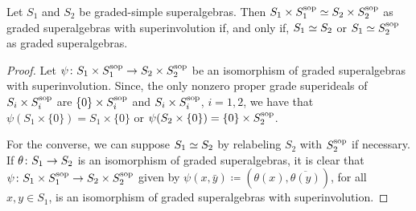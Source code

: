 



\begin{lemma}\label{lemma:iso-SxSsop}
    Let $S_1$ and $S_2$ be graded-simple superalgebras. 
    Then $S_1\times S_1^{\mathrm{sop}} \simeq S_2\times S_2^{\mathrm{sop}}$ as graded superalgebras with superinvolution if, and only if, $S_1 \simeq S_2$ or $S_1 \simeq S_2^{\mathrm{sop}}$ as graded superalgebras.
\end{lemma}

\begin{proof}
    Let $\psi\colon S_1\times S_1^{\mathrm{sop}} \to S_2\times S_2^{\mathrm{sop}}$ be an isomorphism of graded superalgebras with superinvolution. 
    Since, the only nonzero proper grade superideals of $S_i \times S_i^{\mathrm{sop}}$ are $\{ 0 \} \times S_i^{\mathrm{sop}}$ and $S_i\times S_i^{\mathrm{sop}}$, $i = 1,2$, we have that $\psi(S_1\times \{ 0 \}) = S_1\times \{ 0 \}$ or $\psi(S_2\times \{ 0 \}) = \{ 0 \} \times S_2^{\mathrm{sop}}$.  
    
    For the converse, we can suppose $S_1 \simeq S_2$ by relabeling $S_2$ with $S_2^{\mathrm{sop}}$ if necessary.
    If $\theta \colon S_1 \to S_2$ is an isomorphism of graded superalgebras, it is clear that $\psi\colon S_1\times S_1^{\mathrm{sop}} \to S_2\times S_2^{\mathrm{sop}}$ given by $\psi (x, \bar {y}) \coloneqq (\theta(x), \overline{\theta(y)})$, for all $x,y \in S_1$, is an isomorphism of graded superalgebras with superinvolution.
\end{proof}

